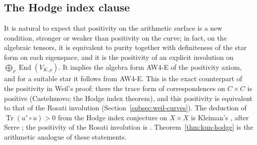 \documentclass[11pt]{amsart}
\theoremstyle{plain}
\theoremstyle{definition}
\theoremstyle{remark}
\numberwithin{equation}{section}
\DeclareMathOperator{\Tr}{Tr}
\begin{document}
\subsection{The Hodge index clause}\label{subsec:kun-hodge}

It is natural to expect that positivity on the arithmetic surface is a
new condition, stronger or weaker than positivity on the curve; in fact,
on the algebraic tensors, it is equivalent to purity together with
definiteness of the star form on each eigenspace, and it is the
positivity of an explicit involution on
$\bigoplus_\rho\operatorname{End}(V_{K,\rho})$. It implies the algebra
form AW4-E of the positivity axiom, and for a suitable star it follows
from AW4-E. This is the exact counterpart of the positivity in Weil's
proof: there the trace form of correspondences on $C\times C$ is
positive (Castelnuovo; the Hodge index theorem), and this positivity is
equivalent to that of the Rosati involution
(Section~\ref{subsec:weil-curves}). The deduction of
$\Tr(u'\circ u)>0$ from the Hodge index conjecture on $X\times X$ is
Kleiman's \cite[3.11, pp.~380--381]{Kleiman1968Cycles}, after Serre
\cite[Th\'eor\`eme~2, p.~394]{Serre1960Analogues}; the positivity of
the Rosati involution is \cite[\S21, Theorem~1, p.~192]{Mumford1974AV}.
Theorem~\ref{thm:kun-hodge} is the arithmetic analogue of these
statements.
\end{document}
